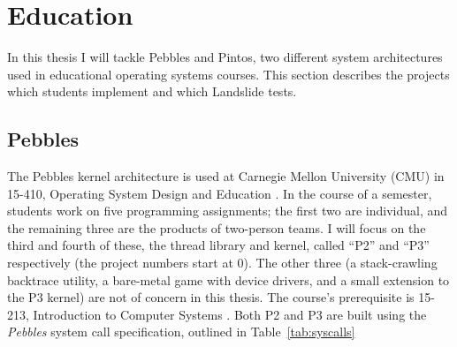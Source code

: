 
\section{Education}
\label{sec:overview-edu}

In this thesis I will tackle Pebbles and Pintos, two different system architectures used in educational operating systems courses.
This section describes the projects which students implement and which Landslide tests.

\subsection{Pebbles}
\label{sec:pebbles}

The Pebbles kernel architecture
is used at Carnegie Mellon University (CMU) in 15-410, Operating System Design and Education \cite{kspec,thrlib}.
In the course of a semester, students work on five programming assignments;
the first two are individual, and the remaining three are the products of two-person teams.
I will focus on the third and fourth of these, the thread library and kernel,
called ``P2'' and ``P3'' respectively (the project numbers start at 0).
The other three (a stack-crawling backtrace utility, a bare-metal game with device drivers, and a small extension to the P3 kernel) are not of concern in this thesis.
The course's prerequisite is 15-213, Introduction to Computer Systems \cite{sigcse01:CSaPP}.
Both P2 and P3 are built using the {\em Pebbles} system call specification, outlined in Table~\ref{tab:syscalls}

